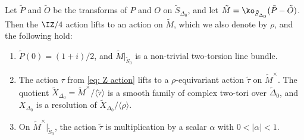 \begin{lem}\label{lem: good reduction at 0}
Let $\tilde P$ and $\tilde O$ be the transforms of $P$ and $O$ on
$\tilde S_{\Delta_0}$, and let $\tilde M=\ko_{\tilde S_{\Delta_0}}(\tilde P-\tilde O)$.
Then the $\IZ/4$ action lifts to an action on $\tilde M$, which we also denote by $\rho$, and the following hold:
\begin{enumerate}
 \item $\tilde P(0)=(1+i)/2$, and $\tilde M|_{\tilde S_0}$ is a
 non-trivial two-torsion line bundle.

 \item The action $\tau$ from \eqref{eq: Z action}  lifts to a $\rho$-equivariant action
 $\tilde\tau$ on $\tilde M^\times$.
The quotient $\tilde X_{\Delta_0}=\tilde M^\times/\langle\tilde\tau\rangle$
 is a smooth family of complex two-tori over $\tilde\Delta_0$, and
 $X_{\Delta_0}$ is a resolution of $\tilde X_{\Delta_0}/\langle\rho\rangle$.

 \item On $\tilde M^\times|_{\tilde S_0}$, the action $\tilde\tau$
 is multiplication by a scalar $\alpha$ with $0<|\alpha|<1$.
\end{enumerate}
\end{lem}